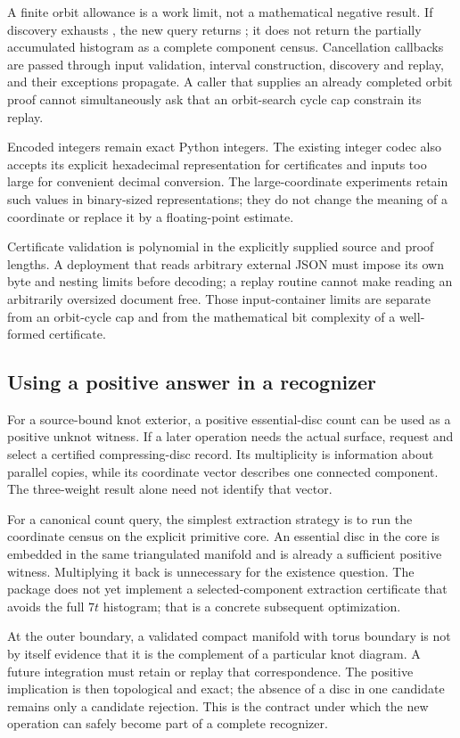 A finite orbit allowance is a work limit, not a mathematical negative result.
If discovery exhausts , the new query returns
; it does not return the partially accumulated histogram as
a complete component census. Cancellation callbacks are passed through input
validation, interval construction, discovery and replay, and their exceptions
propagate. A caller that supplies an already completed orbit proof cannot
simultaneously ask that an orbit-search cycle cap constrain its replay.

Encoded integers remain exact Python integers. The existing integer codec
also accepts its explicit hexadecimal representation for certificates and
inputs too large for convenient decimal conversion. The large-coordinate
experiments retain such values in binary-sized representations; they do not
change the meaning of a coordinate or replace it by a floating-point estimate.

Certificate validation is polynomial in the explicitly supplied source and
proof lengths. A deployment that reads arbitrary external JSON must impose
its own byte and nesting limits before decoding; a replay routine cannot
make reading an arbitrarily oversized document free. Those input-container
limits are separate from an orbit-cycle cap and from the mathematical bit
complexity of a well-formed certificate.

\subsection{Using a positive answer in a recognizer}

For a source-bound knot exterior, a positive essential-disc count can be used
as a positive unknot witness. If a later operation needs the actual surface,
request  and select a certified compressing-disc
record. Its multiplicity is information about parallel copies, while its
coordinate vector describes one connected component. The three-weight result
alone need not identify that vector.

For a canonical count query, the simplest extraction strategy is to run the
coordinate census on the explicit primitive core. An essential disc in the
core is embedded in the same triangulated manifold and is already a sufficient
positive witness. Multiplying it back is unnecessary for the existence
question. The package does not yet implement a selected-component extraction
certificate that avoids the full $7t$ histogram; that is a concrete subsequent
optimization.

At the outer boundary, a validated compact manifold with torus boundary is
not by itself evidence that it is the complement of a particular knot
diagram. A future integration must retain or replay that correspondence.
The positive implication is then topological and exact; the absence of a
disc in one candidate remains only a candidate rejection. This is the
contract under which the new operation can safely become part of a complete
recognizer.
